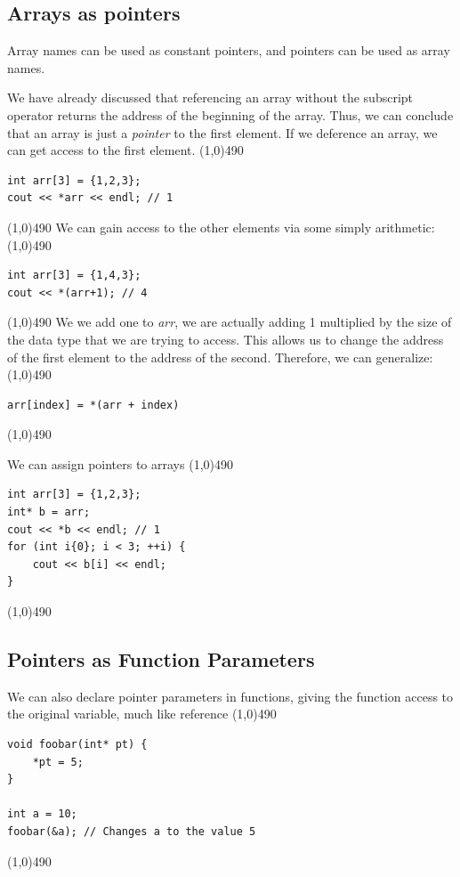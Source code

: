 \documentclass{report}
\begin{document}
    \subsection{Arrays as pointers}
    \bigbreak \noindent 
    \begin{concept}
 Array names can be used as constant pointers, and pointers can be used as array names.
	\end{concept}
    \bigbreak \noindent 
    We have already discussed that referencing an array without the subscript operator returns the address of the beginning of the array. Thus, we can conclude that an array is just a \textit{pointer} to the first element.
    \bigbreak \noindent 
    If we deference an array, we can get access to the first element.
    \bigbreak \noindent 
    \line(1,0){490}
    \begin{verbatim}
int arr[3] = {1,2,3};
cout << *arr << endl; // 1
    \end{verbatim}
    \line(1,0){490}
    \bigbreak \noindent 
    We can gain access to the other elements via some simply arithmetic:
    \bigbreak \noindent 
    \line(1,0){490}
    \begin{verbatim}
int arr[3] = {1,4,3};
cout << *(arr+1); // 4
    \end{verbatim}
    \line(1,0){490}
    \bigbreak \noindent 
    We we add one to \textit{arr}, we are actually adding 1 multiplied by the size of the data type that we are trying to access. This allows us to change the address of the first element to the address of the second.
    \bigbreak \noindent 
    Therefore, we can generalize:
    \bigbreak \noindent 
    \line(1,0){490}
    \begin{verbatim}
arr[index] = *(arr + index)
    \end{verbatim}
    \line(1,0){490}

    \bigbreak \noindent 
    We can assign pointers to arrays
    \bigbreak \noindent 
    \line(1,0){490}
    \begin{verbatim}
int arr[3] = {1,2,3};
int* b = arr;
cout << *b << endl; // 1
for (int i{0}; i < 3; ++i) {
    cout << b[i] << endl;
}
    \end{verbatim}
    \line(1,0){490}

    \pagebreak \bigbreak \noindent 
    \subsection{Pointers as Function Parameters}
    \bigbreak \noindent 
    We can also declare pointer parameters in functions, giving the function access to the original variable, much like reference
    \bigbreak \noindent 
    \line(1,0){490}
    \begin{verbatim}
void foobar(int* pt) {
    *pt = 5;
}

int a = 10;
foobar(&a); // Changes a to the value 5

    \end{verbatim}
    \line(1,0){490}
\end{document}
